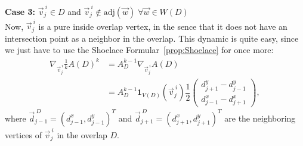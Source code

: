 \begin{proposition}
	\textbf{Case 3:} $\vec{v}_j^{\: i} \in D$ and $\vec{v}_j^{\: i} \notin \text{adj}(\vec{w}) \; \forall \vec{w} \in W(D)$\\
	Now, $\vec{v}_j^{\: i}$ is a pure inside overlap vertex, in the sence that it does not have an intersection point as a neighbor in the overlap. 
	This dynamic is quite easy, since we just have to use the Shoelace Formular~\ref{prop:Shoelace} for once more: 
	\begin{align*}
		\nabla_{\vec{v}_j^{\: i}} \frac{1}{k} A(D)^k 
		&= A_{D}^{k-1} \nabla_{\vec{v}_j^{\: i}} A(D) \\
		&= A_{D}^{k-1} \mathbf{1}_{V(D)}(\vec{v}_j^{\: i}) \dfrac{1}{2} \begin{pmatrix} d_{j+1}^{y} - d_{j-1}^{y} \\[0.5em]  d_{j-1}^{x} - d_{j+1}^{x} \end{pmatrix},
	\end{align*}
	where $\vec{d}_{j-1}^{\: D} = (d_{j-1}^{x}, d_{j-1}^{y})^T$ and $\vec{d}_{j+1}^{\: D} = (d_{j+1}^{x}, d_{j+1}^{y})^T$ are the neighboring vertices of $\vec{v}_j^{\: i}$ in the overlap $D$.\\


\end{proposition}
